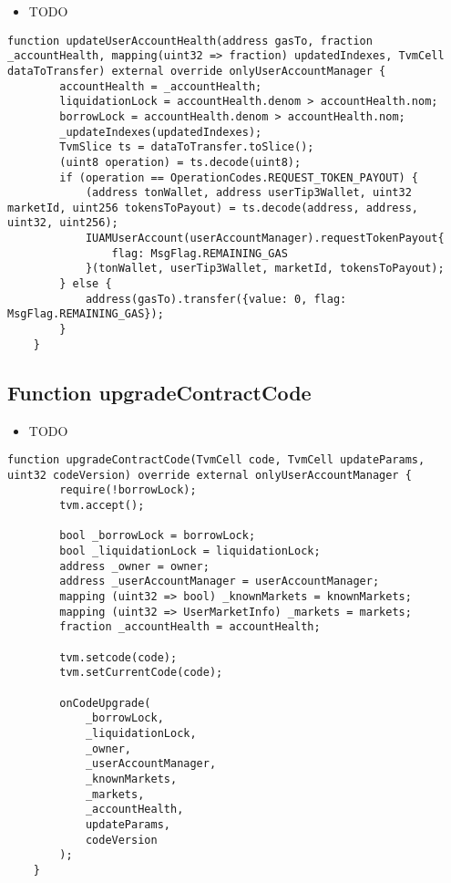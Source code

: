 \noindent\begin{itemize}
\item TODO
\end{itemize}

\begin{lstlisting}[firstnumber=266]
    function updateUserAccountHealth(address gasTo, fraction _accountHealth, mapping(uint32 => fraction) updatedIndexes, TvmCell dataToTransfer) external override onlyUserAccountManager {
        accountHealth = _accountHealth;
        liquidationLock = accountHealth.denom > accountHealth.nom;
        borrowLock = accountHealth.denom > accountHealth.nom;
        _updateIndexes(updatedIndexes);
        TvmSlice ts = dataToTransfer.toSlice();
        (uint8 operation) = ts.decode(uint8);
        if (operation == OperationCodes.REQUEST_TOKEN_PAYOUT) {
            (address tonWallet, address userTip3Wallet, uint32 marketId, uint256 tokensToPayout) = ts.decode(address, address, uint32, uint256);
            IUAMUserAccount(userAccountManager).requestTokenPayout{
                flag: MsgFlag.REMAINING_GAS
            }(tonWallet, userTip3Wallet, marketId, tokensToPayout);
        } else {
            address(gasTo).transfer({value: 0, flag: MsgFlag.REMAINING_GAS});
        }
    }
\end{lstlisting}

\subsection{Function upgradeContractCode}

\noindent\begin{itemize}
\item TODO
\end{itemize}

\begin{lstlisting}[firstnumber=54]
    function upgradeContractCode(TvmCell code, TvmCell updateParams, uint32 codeVersion) override external onlyUserAccountManager {
        require(!borrowLock);
        tvm.accept();

        bool _borrowLock = borrowLock;
        bool _liquidationLock = liquidationLock;
        address _owner = owner;
        address _userAccountManager = userAccountManager;
        mapping (uint32 => bool) _knownMarkets = knownMarkets;
        mapping (uint32 => UserMarketInfo) _markets = markets;
        fraction _accountHealth = accountHealth;

        tvm.setcode(code);
        tvm.setCurrentCode(code);

        onCodeUpgrade(
            _borrowLock,
            _liquidationLock,
            _owner,
            _userAccountManager,
            _knownMarkets,
            _markets,
            _accountHealth,
            updateParams,
            codeVersion
        );
    }
\end{lstlisting}

